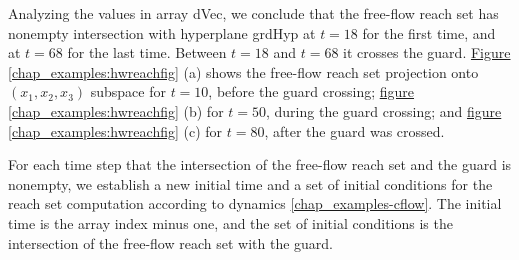 \documentclass[letterpaper,10pt,english]{sphinxmanual}
\begin{document}
Analyzing the values in array dVec, we conclude that the free-flow reach
set has nonempty intersection with hyperplane grdHyp at \(t=18\) for
the first time, and at \(t=68\) for the last time. Between
\(t=18\) and \(t=68\) it crosses the guard. \hyperref[chap_examples:hwreachfig]{Figure  \ref*{chap_examples:hwreachfig}} (a)
shows the free-flow reach set projection onto
\((x_1,x_2,x_3)\) subspace for \(t=10\), before the guard
crossing; \hyperref[chap_examples:hwreachfig]{figure  \ref*{chap_examples:hwreachfig}} (b) for \(t=50\), during the guard
crossing; and \hyperref[chap_examples:hwreachfig]{figure  \ref*{chap_examples:hwreachfig}} (c) for \(t=80\), after the guard
was crossed.

For each time step that the intersection of the free-flow reach set and
the guard is nonempty, we establish a new initial time and a set of
initial conditions for the reach set computation according to dynamics
\eqref{chap_examples-cflow}. The initial time is the array index minus one, and the set of
initial conditions is the intersection of the free-flow reach set with
the guard.
\end{document}
